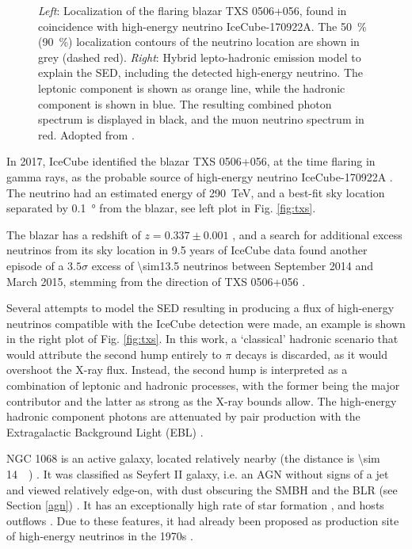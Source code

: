 \documentclass[
    a4paper, %
    fontsize=10pt, %
    twoside=false, %
    numbers=noenddot, %
    fontmethod=tex,
]{kaobook}
\begin{document}
\begin{figure}[htb]
\begin{subfigure}[b]{0.52\textwidth}
    \end{subfigure}
    \caption[TXS 0506+056: Localization and SED]{\textit{Left}: Localization of the flaring blazar TXS 0506+056, found in coincidence with high-energy neutrino IceCube-170922A. The \SI{50}{\percent} (\SI{90}{\percent}) localization contours of the neutrino location are shown in grey (dashed red). \textit{Right}: Hybrid lepto-hadronic emission model to explain the SED, including the detected high-energy neutrino. The leptonic component is shown as orange line, while the hadronic component is shown in blue. The resulting combined photon spectrum is displayed in black, and the muon neutrino spectrum in red. Adopted from \cite{Aartsen2018, Gao2018}.}
\end{figure}

In 2017, IceCube identified the blazar TXS 0506+056, at the time flaring in gamma rays, as the probable source of high-energy neutrino IceCube-170922A . The neutrino had an estimated energy of \SI{290}{\tera\eV}, and a best-fit sky location separated by \SI{0.1}{\degree} from the blazar, see left plot in Fig. \ref{fig:txs}.

The blazar has a redshift of $z=0.337 \pm 0.001$ , and a search for additional excess neutrinos from its sky location in 9.5 years of IceCube data found another episode of a $3.5\sigma$ excess of \num{\sim13.5} neutrinos between September 2014 and March 2015, stemming from the direction of TXS 0506+056 .

Several attempts to model the SED resulting in producing a flux of high-energy neutrinos compatible with the IceCube detection were made, an example is shown in the right plot of Fig. \ref{fig:txs}. In this work, a `classical' hadronic scenario that would attribute the second hump entirely to $\pi$ decays is discarded, as it would overshoot the X-ray flux. Instead, the second hump is interpreted as a combination of leptonic and hadronic processes, with the former being the major contributor and the latter as strong as the X-ray bounds allow. The high-energy hadronic component photons are attenuated by pair production with the Extragalactic Background Light (EBL) \cite{Gao2018}.

NGC 1068 is an active galaxy, located relatively nearby (the distance is \SI{\sim 14}{\mega\parsec}) . It was classified as Seyfert II galaxy, i.e. an AGN without signs of a jet and viewed relatively edge-on, with dust obscuring the SMBH and the BLR (see Section \ref{agn}) . It has an exceptionally high rate of star formation , and hosts outflows . Due to these features, it had already been proposed as production site of high-energy neutrinos in the 1970s .
\end{document}
